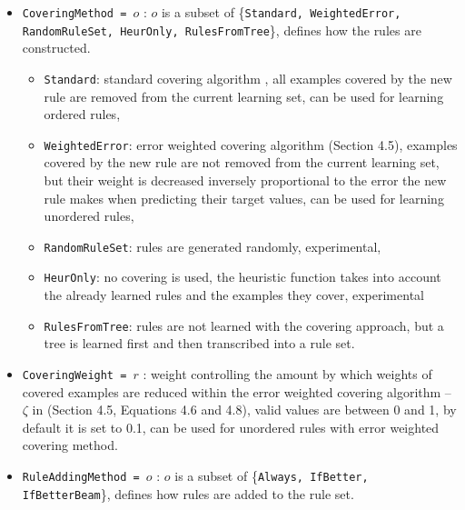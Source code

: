 \documentclass[a4paper]{report}
\begin{document}
\begin{itemize}
	\item \texttt{CoveringMethod = $o$} : $o$ is a subset of \{\texttt{Standard, %
	WeightedError, %
	RandomRuleSet, %
	HeurOnly, RulesFromTree}\}, defines how the rules are constructed.
	\begin{itemize}
		\item \texttt{Standard}: standard covering algorithm \cite{Michalski1969}, all examples covered by the new rule are removed from the current learning set, can be used for learning ordered rules,
		\item \texttt{WeightedError}: error weighted covering algorithm \cite{Zenko07} (Section 4.5), examples covered by the new rule are not removed from the current learning set, but their weight is decreased inversely proportional to the error the new rule makes when predicting their target values, can be used for learning unordered rules,
		\item \texttt{RandomRuleSet}: rules are generated randomly, experimental,
		\item \texttt{HeurOnly}: no covering is used, the heuristic function takes into account the already learned rules and the examples they cover, experimental
		\item \texttt{RulesFromTree}: rules are not learned with the covering approach, but a tree is learned first and then transcribed into a rule set.
	\end{itemize}
	\item \texttt{CoveringWeight = $r$} : weight controlling the amount by which weights of covered examples are reduced within the error weighted covering algorithm -- $\zeta$ in \cite{Zenko07} (Section 4.5, Equations 4.6 and 4.8), valid values are between 0 and 1, by default it is set to 0.1, can be used for unordered rules with error weighted covering method.
	\item \texttt{RuleAddingMethod = $o$} : $o$ is a subset of \{\texttt{Always, IfBetter, IfBetterBeam}\}, defines how rules are added to the rule set.
	\begin{itemize}

\end{itemize}
\end{itemize}
\end{document}
